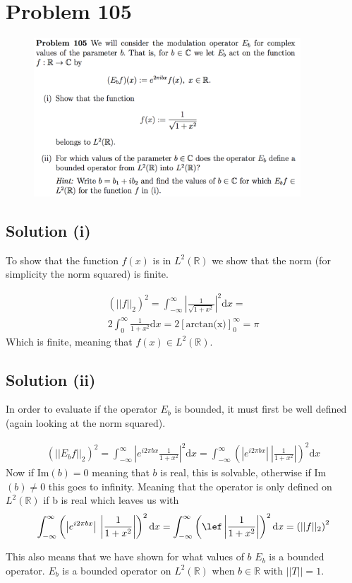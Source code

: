 \documentclass{article}
\begin{document}
\section*{Problem 105}
\begin{figure}[H]
\centering
    \includegraphics[width=10cm]{fig/prob105}
\end{figure}

\subsection*{Solution (i)}
To show that the function $f(x)$ is in $L^2(\mathbb{R})$ we show that the norm (for simplicity the norm squared) is finite.

\begin{gather*}
   \left( ||f||_2\right)^2=\int_{-\infty}^\infty \left |\frac{1}{\sqrt{1+x^2}}\right |^2 \text{d}x  = \\
    2\int_{0}^\infty \frac{1}{1+x^2} \text{d}x  =  2\left [\text{arctan(x)} \right]_0^\infty  = \pi
\end{gather*}
Which is finite, meaning that $f(x) \in L^2(\mathbb{R})$.

\subsection*{Solution (ii)}
In order to evaluate if the operator $E_b$ is bounded, it must first be well defined (again looking at the norm squared).

\begin{gather*}
    \left( ||E_b f||_2\right)^2 = \int_{-\infty}^\infty \left |e^{i 2 \pi b x}\frac{1}{1+x^2}\right |^2 \text{d}x = \int_{-\infty}^\infty \left(\left |e^{i 2 \pi b x}\right |\: \left |\frac{1}{1+x^2}\right |\right)^2 \text{d}x
\end{gather*}
Now if Im$(b)=0$ meaning that $b$ is real, this is solvable, otherwise if Im$(b)\neq 0$ this goes to infinity. Meaning that the operator is only defined on $L^2(\mathbb{R})$ if b is real which leaves us with
\begin{gather*}
     \int_{-\infty}^\infty \left(\left |e^{i 2 \pi b x}\right |\: \left |\frac{1}{1+x^2}\right |\right)^2 \text{d}x =  \int_{-\infty}^\infty \left(\lef \left |\frac{1}{1+x^2}\right |\right)^2 \text{d}x = \left( ||f||_2\right)^2
\end{gather*}

This also means that we have shown for what values of $b$ $E_b$ is a bounded operator. $E_b$ is a bounded operator on $L^2(\mathbb{R})$ when $b \in \mathbb{R}$ with $||T|| = 1$.
\end{document}
